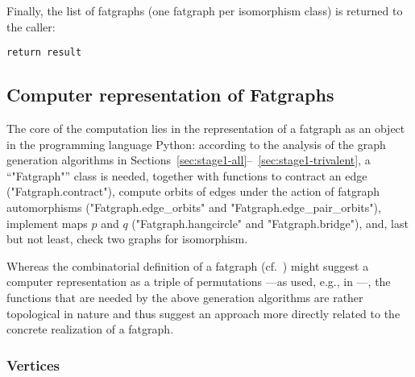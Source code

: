 Finally, the list of fatgraphs (one fatgraph per isomorphism class) is
returned to the caller:
\begin{lstlisting}[name=MgnTrivalentGraphs,firstnumber=50]
    return result
\end{lstlisting}


\subsection{Computer representation of Fatgraphs}
\label{sec:stage1-fatgraphs}

The core of the computation lies in the representation of a fatgraph
as an object in the programming language Python: according to the
analysis of the graph generation algorithms in
Sections~\ref{sec:stage1-all}--~\ref{sec:stage1-trivalent}, a
``"Fatgraph"'' class is needed, together with functions to contract an
edge ("Fatgraph.contract"), compute orbits of edges under the action
of fatgraph automorphisms ("Fatgraph.edge_orbits" and
"Fatgraph.edge_pair_orbits"), implement maps $p$ and $q$
("Fatgraph.hangcircle" and "Fatgraph.bridge"), and, last but not
least, check two graphs for isomorphism.

Whereas the combinatorial definition of a fatgraph
(cf.~) might suggest a computer representation as
a triple of permutations ---as used, e.g., in \cite[Section
2.4]{arXiv:0902.1025}---, the functions that are needed by the above
generation algorithms are rather topological in nature and thus
suggest an approach more directly related to the concrete realization
of a fatgraph.

\subsubsection{Vertices}
\label{sec:vertices}

